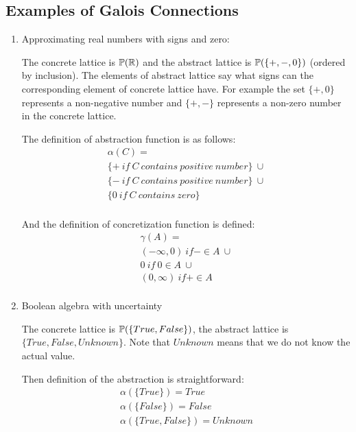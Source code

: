 \subsection*{Examples of Galois Connections}
\begin{enumerate}
    \item Approximating real numbers with signs and zero:

    The concrete lattice is $\mathbb{P}(\mathbb{R})$ and the abstract lattice is $\mathbb{P}(\{+, -, 0\})$ (ordered by
    inclusion).
    The elements of abstract lattice say what signs can the corresponding element of concrete lattice have.
    For example the set $\{+, 0\}$ represents a non-negative number and $\{+, -\}$ represents a non-zero number in the
    concrete lattice.

    The definition of abstraction function is as follows:
    \begin{gather*}
        \alpha(C) =\\
        \{+ \: if \: C \: contains \: positive \: number\} \: \cup\\
        \{- \: if \: C \: contains \: positive \: number\} \: \cup\\
        \{0 \: if \: C \: contains \: zero\}\\
    \end{gather*}

    And the definition of concretization function is defined:
    \begin{gather*}
        \gamma(A) =\\
        (-\infty, 0) \: if - \in A \: \cup\\
        {0} \: if \: 0 \in A \: \cup\\
        (0, \infty) \: if + \in A \: \\
    \end{gather*}

    \item Boolean algebra with uncertainty

    The concrete lattice is $\mathbb{P}(\{True, False\})$, the abstract lattice is \\ $\{True, False, Unknown\}$.
    Note that $Unknown$ means that we do not know the actual value.

    Then definition of the abstraction is straightforward:
    \begin{gather*}
        \alpha(\{True\}) = True\\
        \alpha(\{False\}) = False\\
        \alpha(\{True, False\}) = Unknown
    \end{gather*}


\end{enumerate}
